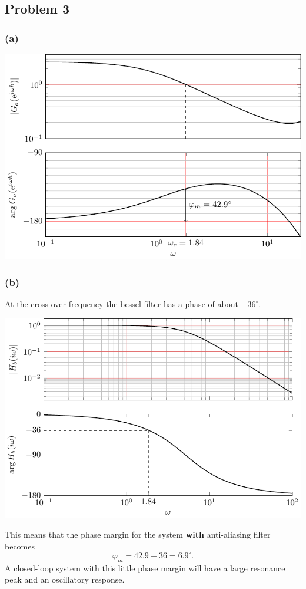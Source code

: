 \documentclass[letterpaper,12pt]{scrartcl}
\begin{document}
\subsection*{Problem 3}

\subsubsection*{(a)}
\begin{center}
\includegraphics[width=0.9\linewidth]{../../figures/maglev_ss_loopgain_bode_sol}
\end{center}

\subsubsection*{(b)}
At the cross-over frequency the bessel filter has a phase of about $-36^\circ$. 
\begin{center}
\includegraphics[width=0.8\linewidth]{../../figures/maglev_bessel_aa_bode_sol}
\end{center}
This means that the phase margin for the system \textbf{with} anti-aliasing filter becomes 
\[ \varphi_m = 42.9 - 36 = 6.9^\circ.\] A closed-loop system with this little phase margin will have a large resonance peak and an oscillatory response. 
\end{document}
